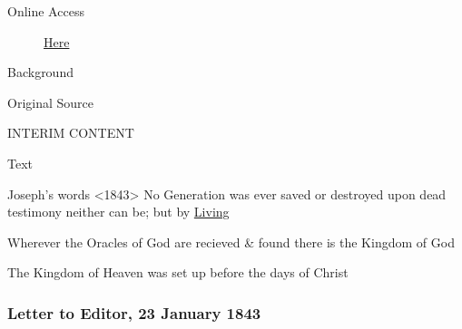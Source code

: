 				\begin{description}
					\item[Online Access] \href{https://www.josephsmithpapers.org/paper-summary/discourse-22-january-1843-as-reported-by-franklin-d-richards/1}{Here}
				\end{description}
				
				\begin{description}
					\item[Background]
				\end{description}
				
				
				\begin{description}
					\item[Original Source]
				\end{description}
				
					INTERIM CONTENT
				
				
				\begin{description}
					\item[Text]
				\end{description}
				
					Joseph's words <1843> No Generation was ever saved or destroyed upon dead testimony neither can be; but by \uline{Living}
					
					Wherever the Oracles of God are recieved \& found there is the Kingdom of God
					
					The Kingdom of Heaven was set up before the days of Christ
					
		\subsubsection{Letter to Editor, 23 January 1843}
			\label{EMS-1843-JS-23-JAN-1843}
			
